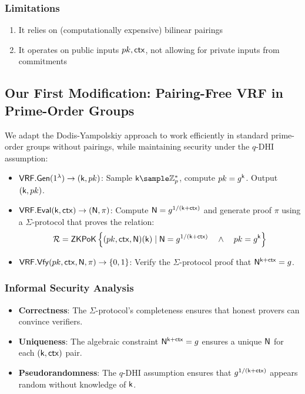 \subsubsection{Limitations}
\begin{enumerate}
    \item It relies on (computationally expensive) bilinear pairings
    \item It operates on public inputs $pk, \mathsf{ctx}$, not allowing for private inputs from commitments
\end{enumerate}

\subsection{Our First Modification: Pairing-Free VRF in Prime-Order Groups}
We adapt the Dodis-Yampolskiy approach to work efficiently in standard prime-order groups without pairings, while maintaining security under the $q$-DHI assumption:

\begin{itemize}
    \item $\mathsf{VRF.Gen}(1^\lambda) \to (\mathsf{k}, pk)$: Sample $\k \sample \mathbb{Z}_p^*$, compute $pk = g^{\mathsf{k}}$. Output $(\mathsf{k}, pk)$.
    \item $\mathsf{VRF.Eval}(\mathsf{k}, \mathsf{ctx}) \to (\mathsf{N}, \pi)$: Compute $\mathsf{N} = g^{1/(\mathsf{k} + \mathsf{ctx})}$ and generate proof $\pi$ using a $\Sigma$-protocol that proves the relation:
    \[
    \mathcal{R} = {\mathsf{ZKPoK}} \left\{(pk, \mathsf{ctx}, \mathsf{N}) (\mathsf{k}) \mid \mathsf{N} = g^{1/(\mathsf{k} + \mathsf{ctx})} \quad \wedge \quad pk = g^{\mathsf{k}}  \right\}
    \]
    \item $\mathsf{VRF.Vfy}(pk, \mathsf{ctx}, \mathsf{N}, \pi) \to \{0,1\}$: Verify the $\Sigma$-protocol proof that $\mathsf{N}^{\mathsf{k}+\mathsf{ctx}} = g$.
\end{itemize}

\subsubsection{Informal Security Analysis}
\begin{itemize}
    \item \textbf{Correctness}: The $\Sigma$-protocol's completeness ensures that honest provers can convince verifiers.
    \item \textbf{Uniqueness}: The algebraic constraint $\mathsf{N}^{\mathsf{k}+\mathsf{ctx}} = g$ ensures a unique $\mathsf{N}$ for each $(\mathsf{k},\mathsf{ctx})$ pair.
    \item \textbf{Pseudorandomness}: The $q$-DHI assumption ensures that $g^{1/(\mathsf{k}+\mathsf{ctx})}$ appears random without knowledge of $\mathsf{k}$.
\end{itemize}

